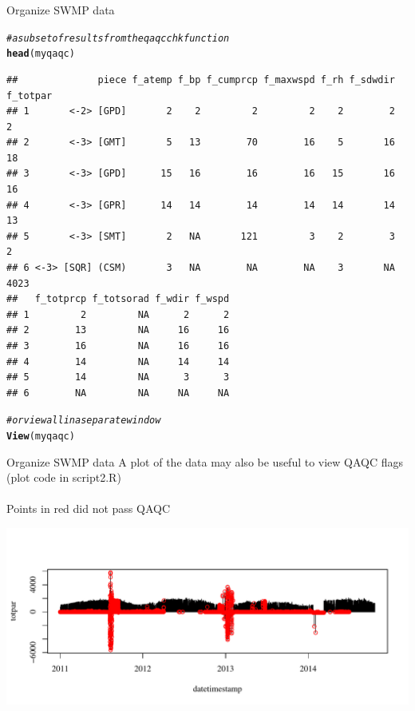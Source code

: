 \documentclass[xcolor=svgnames]{beamer}\usepackage[]{graphicx}\usepackage[]{color}
\makeatletter
\def\maxwidth{ %
  \ifdim\Gin@nat@width>\linewidth
    \linewidth
  \else
    \Gin@nat@width
  \fi
}
\newcommand{\hlcom}[1]{\textcolor[rgb]{0.678,0.584,0.686}{\textit{#1}}}%
\newcommand{\hlstd}[1]{\textcolor[rgb]{0.345,0.345,0.345}{#1}}%
\newcommand{\hlkwd}[1]{\textcolor[rgb]{0.737,0.353,0.396}{\textbf{#1}}}%
\newenvironment{kframe}{%
 \def\at@end@of@kframe{}%
 \ifinner\ifhmode%
  \def\at@end@of@kframe{\end{minipage}}%
  \begin{minipage}{\columnwidth}%
 \fi\fi%
 \def\FrameCommand##1{\hskip\@totalleftmargin \hskip-\fboxsep
 \colorbox{shadecolor}{##1}\hskip-\fboxsep
     \hskip-\linewidth \hskip-\@totalleftmargin \hskip\columnwidth}%
 \MakeFramed {\advance\hsize-\width
   \@totalleftmargin\z@ \linewidth\hsize
   \@setminipage}}%
 {\par\unskip\endMakeFramed%
 \at@end@of@kframe}
\newenvironment{knitrout}{}{} %
\makeatother
\begin{document}
\begin{frame}[containsverbatim]{Organize SWMP data}
\begin{knitrout}\scriptsize
{}\color{fgcolor}\begin{kframe}
\begin{alltt}
\hlcom{# a subset of results from the qaqcchk function}
\hlkwd{head}\hlstd{(myqaqc)}
\end{alltt}
\begin{verbatim}
##              piece f_atemp f_bp f_cumprcp f_maxwspd f_rh f_sdwdir f_totpar
## 1       <-2> [GPD]       2    2         2         2    2        2        2
## 2       <-3> [GMT]       5   13        70        16    5       16       18
## 3       <-3> [GPD]      15   16        16        16   15       16       16
## 4       <-3> [GPR]      14   14        14        14   14       14       13
## 5       <-3> [SMT]       2   NA       121         3    2        3        2
## 6 <-3> [SQR] (CSM)       3   NA        NA        NA    3       NA     4023
##   f_totprcp f_totsorad f_wdir f_wspd
## 1         2         NA      2      2
## 2        13         NA     16     16
## 3        16         NA     16     16
## 4        14         NA     14     14
## 5        14         NA      3      3
## 6        NA         NA     NA     NA
\end{verbatim}
\begin{alltt}
\hlcom{# or view all in a separate window}
\hlkwd{View}\hlstd{(myqaqc)}
\end{alltt}
\end{kframe}
\end{knitrout}
\end{frame}

\begin{frame}[containsverbatim]{Organize SWMP data}
A plot of the data may also be useful to view QAQC flags (plot code in script2.R)\\~\\
Points in red did not pass QAQC
\begin{knitrout}\scriptsize
{}\color{fgcolor}

{\centering \includegraphics[width=\maxwidth]{figure/qaqc_ex} 

}



\end{knitrout}
\end{frame}
\end{document}
